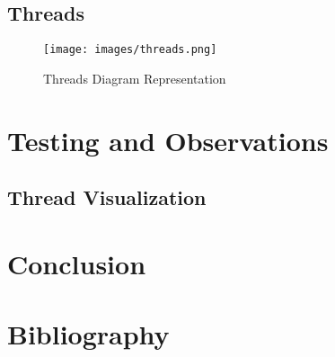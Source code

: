 \documentclass[12pt]{article}
\begin{document}
\subsection{Threads}

\begin{figure}[!htb]
 \centering
 \texttt{[image: images/threads.png]}
 \caption{Threads Diagram Representation}
 \label{fig:threads}
\end{figure}


\section{Testing and Observations}
\subsection{Thread Visualization}
\subsection{}



\section{Conclusion}

\newpage
\section{Bibliography}

 
\end{document}
